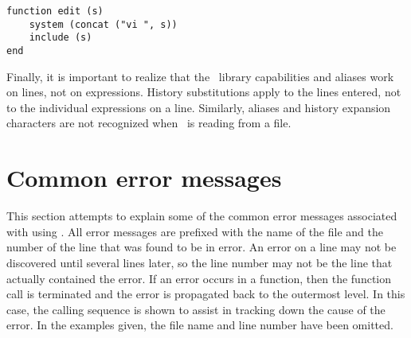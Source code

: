 \begin{screen}
\begin{verbatim}
function edit (s)
    system (concat ("vi ", s))
    include (s)
end
\end{verbatim}
\end{screen}

Finally, it is important to realize that the \rl\ library capabilities
and aliases work on lines, not on expressions.  History substitutions
apply to the lines entered, not to the individual expressions on a
line.  Similarly, aliases and history expansion characters are not
recognized when \burlap\ is reading from a file.


\section{Common error messages}
\label{burlap.errors}

This section attempts to explain some of the common error messages
associated with using \burlap.  All error messages are prefixed with
the name of the file and the number of the line that was found to be
in error.  An error on a line may not be discovered until several
lines later, so the line number may not be the line that actually
contained the error.  If an error occurs in a function, then the
function call is terminated and the error is propagated back to the
outermost level.  In this case, the calling sequence is shown to
assist in tracking down the cause of the error.  In the examples
given, the file name and line number have been omitted.

